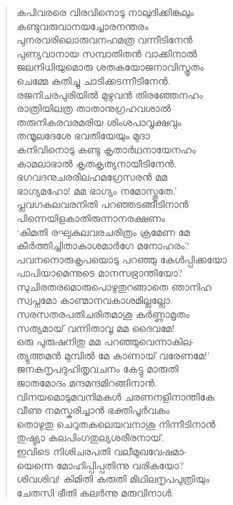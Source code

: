 \begin{verse}
കപിവരരെ വിരവിനൊടു നാലുദിക്കിങ്കലും\\
കണ്ടുവരുവാനയച്ചോരനന്തരം\\
പുനരവരിലൊരുവനഹമത്ര വന്നീടിനേന്‍\\
പുണ്യവാനായ സമ്പാതിതന്‍ വാക്കിനാല്‍\\
ജലനിധിയുമൊരു ശതകയോജനാവിസ്തൃതം\\
ചെമ്മേ കുതിച്ചു ചാടിക്കടന്നീടിനേന്‍.\\
രജനിചരപുരിയില്‍ മുഴുവന്‍ തിരഞ്ഞേനഹം\\
രാത്രിയിലത്ര താതാനുഗ്രഹവശാല്‍\\
തരുനികരവരമരിയ ശിംശപാവൃക്ഷവും\\
തന്മൂലദേശേ ഭവതിയേയും മുദാ\\
കനിവിനൊടു കണ്ടു കൃതാര്‍ഥനായേനഹം\\
കാമലാഭാല്‍ കൃതകൃത്യനായീടിനേന്‍.\\
ഭഗവദനുചരരിലഹമഗ്രേസരന്‍ മമ\\
ഭാഗ്യമഹോ! മമ ഭാഗ്യം നമോസ്തുതേ.’\\
പ്ലവഗകുലവരനിതി പറഞ്ഞടങ്ങീടിനാന്‍\\
പിന്നെയിളകാതിരുന്നാനരക്ഷണം\\
‘കിമതി രഘുകുലവരചരിത്രം ക്രമേണ മേ\\
കീര്‍ത്തിച്ചിതാകാശമാര്‍ഗേ മനോഹരം?\\
പവനനൊരുകൃപയൊടു പറഞ്ഞു കേള്‍പ്പിക്കയോ\\
പാപിയാമെന്നുടെ മാനസഭ്രാന്തിയോ?\\
സുചിരതരമൊരുപൊഴുതുറങ്ങാതെ ഞാനിഹ\\
സ്വപ്നമോ കാണ്മാനവകാശമില്ലല്ലോ.\\
സരസതരപതിചരിതമാശു കര്‍ണ്ണാമൃതം\\
സത്യമായ് വന്നിതാവൂ മമ ദൈവമേ!\\
ഒരു പുരുഷനിതു മമ പറഞ്ഞുവെന്നാകില-\\
ത്യുത്തമന്‍ മുമ്പില്‍ മേ കാണായ് വരേണമേ!’\\
ജനകനൃപദുഹിതൃവചനം കേട്ടു മാരുതി\\
ജാതമോദം മന്ദമന്ദമിറങ്ങിനാന്‍.\\
വിനയമൊടുമവനിമകള്‍ ചരണനളിനാന്തികേ\\
വീണു നമസ്കരിച്ചാന്‍ ഭക്തിപൂര്‍വകം\\
തൊഴുതു ചെറുതകലെയവനാശു നിന്നീടിനാന്‍\\
തുഷ്ട്യാ കലപിംഗതുല്യശരീരനായ്.\\
ഇവിടെ നിശിചരപതി വലീമുഖവേഷമാ-\\
യെന്നെ മോഹിപ്പിപ്പതിന്നു വരികയോ?\\
ശിവശിവ! കിമിതി കരുതി മിഥിലനൃപപുത്രിയും\\
ചേതസി ഭീതി കലര്‍ന്നു മരുവിനാള്‍.\\

\end{verse}
